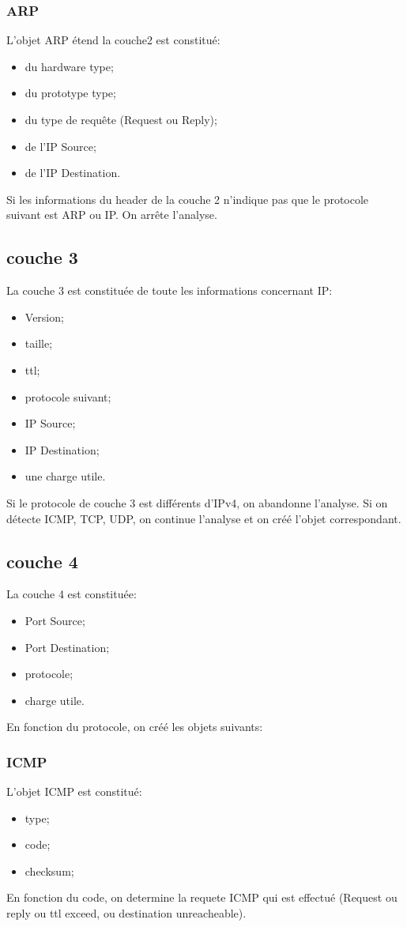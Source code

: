     \subsubsection{ARP}
L'objet ARP étend la couche2 est constitué:
\begin{itemize}
    \item du hardware type;
    \item du prototype type;
    \item du type de requête (Request ou Reply);
    \item de l'IP Source;
    \item de l'IP Destination.
\end{itemize}      
Si les informations du header de la couche 2 n'indique pas que le protocole suivant est ARP ou IP. On arrête l'analyse.

\subsection{couche 3}
La couche 3 est constituée de toute les informations concernant IP:
\begin{itemize}
    \item Version;
    \item taille;
    \item ttl;
    \item protocole suivant;
    \item IP Source;
    \item IP Destination;
    \item une charge utile.
\end{itemize}      
Si le protocole de couche 3 est différents d'IPv4, on abandonne l'analyse.
Si on détecte ICMP, TCP, UDP, on continue l'analyse et on créé l'objet correspondant.

\subsection{couche 4}
La couche 4 est constituée:
\begin{itemize}
    \item Port Source;
    \item Port Destination;
    \item protocole;
    \item charge utile.
\end{itemize}      
En fonction du protocole, on créé les objets suivants:
    \subsubsection{ICMP}
L'objet ICMP est constitué:
\begin{itemize}
    \item type;
    \item code;
    \item checksum;
\end{itemize}      
En fonction du code, on determine la requete ICMP qui est effectué (Request ou reply ou ttl exceed, ou destination unreacheable).

